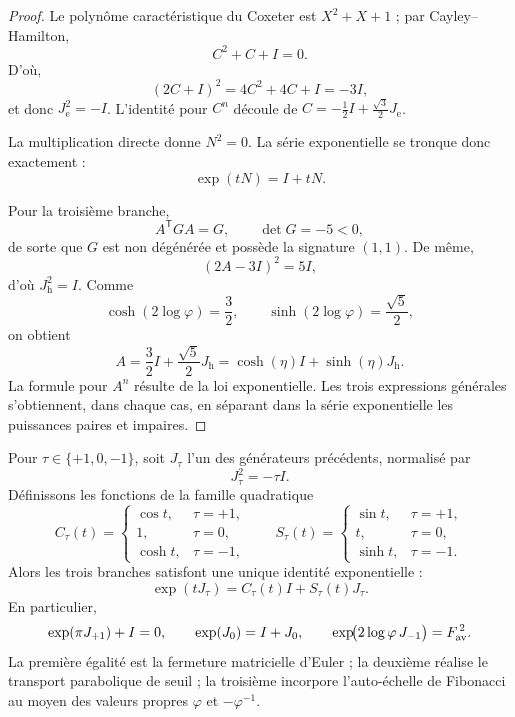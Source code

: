 \begin{proof}
Le polynôme caractéristique du Coxeter est \(X^2+X+1\) ; par
Cayley--Hamilton,
\[
C^2+C+I=0.
\]
D'où,
\[
(2C+I)^2=4C^2+4C+I=-3I,
\]
et donc \(J_{\mathrm e}^2=-I\). L'identité pour \(C^n\) découle de
\(C=-\frac12I+\frac{\sqrt3}{2}J_{\mathrm e}\).

La multiplication directe donne \(N^2=0\). La série exponentielle se
tronque donc exactement :
\[
\exp(tN)=I+tN.
\]

Pour la troisième branche,
\[
A^{\mathsf T}GA=G,\qquad
\det G=-5<0,
\]
de sorte que \(G\) est non dégénérée et possède la signature \((1,1)\). De même,
\[
(2A-3I)^2=5I,
\]
d'où \(J_{\mathrm h}^2=I\). Comme
\[
\cosh(2\log\varphi)=\frac32,
\qquad
\sinh(2\log\varphi)=\frac{\sqrt5}{2},
\]
on obtient
\[
A=\frac32I+\frac{\sqrt5}{2}J_{\mathrm h}
=\cosh(\eta)I+\sinh(\eta)J_{\mathrm h}.
\]
La formule pour \(A^n\) résulte de la loi exponentielle. Les trois expressions
générales s'obtiennent, dans chaque cas, en séparant dans la série exponentielle les
puissances paires et impaires.
\end{proof}

\begin{corollary}
\label{cor:euler-extendida-trit-fibonacci}
Pour \(\tau\in\{+1,0,-1\}\), soit \(J_\tau\) l'un des générateurs
précédents, normalisé par
\[
 J_\tau^2=-\tau I.
\]
Définissons les fonctions de la famille quadratique
\[
 C_\tau(t)=
 \begin{cases}
  \cos t,&\tau=+1,\\
  1,&\tau=0,\\
  \cosh t,&\tau=-1,
 \end{cases}
 \qquad
 S_\tau(t)=
 \begin{cases}
  \sin t,&\tau=+1,\\
  t,&\tau=0,\\
  \sinh t,&\tau=-1.
 \end{cases}
\]
Alors les trois branches satisfont une unique identité exponentielle :
\begin{equation}
 \boxed{\exp(tJ_\tau)=C_\tau(t)I+S_\tau(t)J_\tau.}
 \label{eq:euler-extendida-trit-fibonacci}
\end{equation}
En particulier,
\[
 \exp(\pi J_{+1})+I=0,
 \qquad
 \exp(J_0)=I+J_0,
 \qquad
 \exp\!\bigl(2\log\varphi\,J_{-1}\bigr)=F_{\rm av}^{\,2}.
\]
La première égalité est la fermeture matricielle d'Euler ; la deuxième réalise le
transport parabolique de seuil ; la troisième incorpore l'auto-échelle de
Fibonacci au moyen des valeurs propres \(\varphi\) et \(-\varphi^{-1}\).
\end{corollary}

